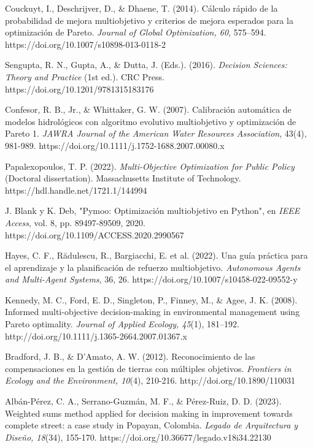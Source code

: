 \documentclass[12pt]{article}
\begin{document}
\begin{thebibliography}{99}

Couckuyt, I., Deschrijver, D., \& Dhaene, T. (2014). Cálculo rápido de la probabilidad de mejora multiobjetivo y criterios de mejora esperados para la optimización de Pareto. \textit{Journal of Global Optimization, 60}, 575–594. https://doi.org/10.1007/s10898-013-0118-2

Sengupta, R. N., Gupta, A., \& Dutta, J. (Eds.). (2016). \textit{Decision Sciences: Theory and Practice} (1st ed.). CRC Press. https://doi.org/10.1201/9781315183176

Confesor, R. B., Jr., \& Whittaker, G. W. (2007). Calibración automática de modelos hidrológicos con algoritmo evolutivo multiobjetivo y optimización de Pareto 1. \textit{JAWRA Journal of the American Water Resources Association}, 43(4), 981-989. 
https://doi.org/10.1111/j.1752-1688.2007.00080.x

Papalexopoulos, T. P. (2022). \textit{Multi-Objective Optimization for Public Policy} (Doctoral dissertation). Massachusetts Institute of Technology. https://hdl.handle.net/1721.1/144994

J. Blank y K. Deb, "Pymoo: Optimización multiobjetivo en Python", en \textit{IEEE Access}, vol. 8, pp. 89497-89509, 2020.
https://doi.org/10.1109/ACCESS.2020.2990567

Hayes, C. F., Rădulescu, R., Bargiacchi, E. et al. (2022). Una guía práctica para el aprendizaje y la planificación de refuerzo multiobjetivo. \textit{Autonomous Agents and Multi-Agent Systems}, 36, 26. https://doi.org/10.1007/s10458-022-09552-y

Kennedy, M. C., Ford, E. D., Singleton, P., Finney, M., \& Agee, J. K. (2008). Informed multi-objective decision-making in environmental management using Pareto optimality. \textit{Journal of Applied Ecology, 45}(1), 181–192. http://doi.org/10.1111/j.1365-2664.2007.01367.x

Bradford, J. B., \& D'Amato, A. W. (2012). Reconocimiento de las compensaciones en la gestión de tierras con múltiples objetivos. \textit{Frontiers in Ecology and the Environment, 10}(4), 210-216. http://doi.org/10.1890/110031

Albán-Pérez, C. A., Serrano-Guzmán, M. F., \& Pérez-Ruiz, D. D. (2023). Weighted sums method applied for decision making in improvement towards complete street: a case study in Popayan, Colombia. \textit{Legado de Arquitectura y Diseño, 18}(34), 155-170. https://doi.org/10.36677/legado.v18i34.22130


\end{thebibliography}
\end{document}
